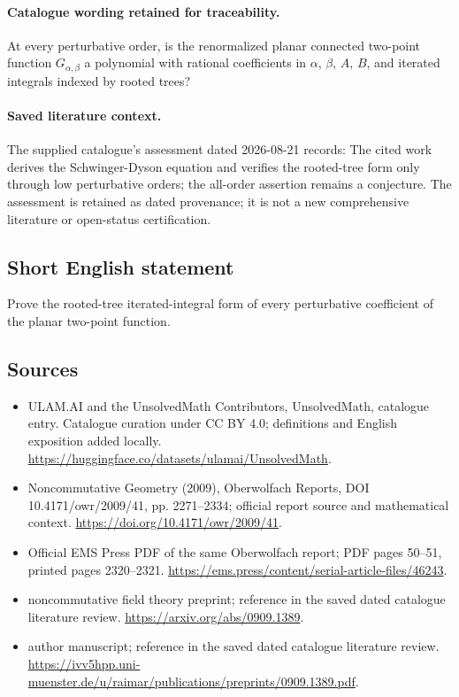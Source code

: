 \documentclass[11pt]{article}
\begin{document}
\paragraph{Catalogue wording retained for traceability.}
At every perturbative order, is the renormalized planar connected two-point function $G_{\alpha,\beta}$ a polynomial with rational coefficients in $\alpha$, $\beta$, $A$, $B$, and iterated integrals indexed by rooted trees?

\paragraph{Saved literature context.} The supplied catalogue's assessment dated 2026-08-21 records: The cited work derives the Schwinger-Dyson equation and verifies the rooted-tree form only through low perturbative orders; the all-order assertion remains a conjecture. The assessment is retained as dated provenance; it is not a new comprehensive literature or open-status certification.
\subsection{Short English statement}
Prove the rooted-tree iterated-integral form of every perturbative coefficient of the planar two-point function.
\subsection{Sources}
\begin{itemize}
\item[\hypertarget{source:statement:1}{S1}] ULAM.AI and the UnsolvedMath Contributors, UnsolvedMath, catalogue entry. Catalogue curation under CC BY 4.0; definitions and English exposition added locally.
\url{https://huggingface.co/datasets/ulamai/UnsolvedMath}.
\item[\hypertarget{source:statement:2}{S2}] Noncommutative Geometry (2009), Oberwolfach Reports, DOI 10.4171/owr/2009/41, pp. 2271--2334; official report source and mathematical context.
\url{https://doi.org/10.4171/owr/2009/41}.
\item[\hypertarget{source:statement:3}{S3}] Official EMS Press PDF of the same Oberwolfach report; PDF pages 50--51, printed pages 2320--2321.
\url{https://ems.press/content/serial-article-files/46243}.
\item[\hypertarget{source:statement:4}{S4}] noncommutative field theory preprint; reference in the saved dated catalogue literature review.
\url{https://arxiv.org/abs/0909.1389}.
\item[\hypertarget{source:statement:5}{S5}] author manuscript; reference in the saved dated catalogue literature review.
\url{https://ivv5hpp.uni-muenster.de/u/raimar/publications/preprints/0909.1389.pdf}.
\end{itemize}
\label{end:statement}
\end{document}
